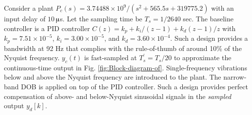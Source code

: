 \documentclass [11pt, proquest] {uwthesis}[2020/02/24]
\begin{document}
Consider a plant $P_{c}(s)=3.74488\times10^{9}/(s^{2}+565.5s+319775.2)$
with an input delay of $10\,$$\muup$s. Let the sampling time
be $T_{s}=1/2640$ sec. The baseline controller is a PID controller
$C(z)=k_{p}+k_{i}/(z-1)+k_{d}(z-1)/z$ with $k_{p}=7.51\times10^{-5}$,
$k_{i}=3.00\times10^{-5}$, and $k_{d}=3.60\times10^{-4}$. Such a
design provides a bandwidth at 92 Hz that complies with the rule-of-thumb
of around 10\% of the Nyquist frequency. $y_{c}(t)$ is fast-sampled
at $T_{s}^{'}=T_{s}/20$ to approximate the continuous-time output
in Fig. \ref{fig:Block-diagram-of}. Single-frequency vibrations below
and above the Nyquist frequency are introduced to the plant. The narrow-band
DOB \cite{XuChen_TCST2012} is applied on top
of the PID controller. Such a design provides perfect compensation
of above- and below-Nyquist sinusoidal signals in the \emph{sampled}
output $y_{d}[k]$.
\begin{figure}[!ht]
\begin{centering}
\end{centering}
\end{figure}$$
\end{document}
